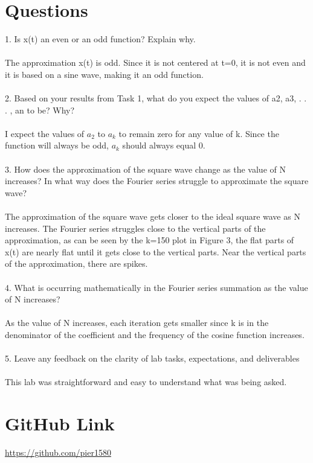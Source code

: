 \section{Questions}
1. Is x(t) an even or an odd function? Explain why.
\\ \\
The approximation x(t) is odd.  Since it is not centered at t=0, it is not even and it is based on a sine wave, making it an odd function.
\\ \\
2. Based on your results from Task 1, what do you expect the values of a2, a3, . . . , an to be?  Why?
\\ \\
I expect the values of $a_2$ to $a_{k}$ to remain zero for any value of k.  Since the function will always be odd, $a_k$ should always equal 0.
\\ \\
3. How does the approximation of the square wave change as the value of N increases? In what way does the Fourier series struggle to approximate the square wave?
\\ \\ 
The approximation of the square wave gets closer to the ideal square wave as N increases.  The Fourier series struggles close to the vertical parts of the approximation, as can be seen by the k=150 plot in Figure 3, the flat parts of x(t) are nearly flat until it gets close to the vertical parts.  Near the vertical parts of the approximation, there are spikes.
\\ \\
4. What is occurring mathematically in the Fourier series summation as the value of N increases?
\\ \\ 
As the value of N increases, each iteration gets smaller since k is in the denominator of the coefficient and the frequency of the cosine function increases.
\\ \\ 
5. Leave any feedback on the clarity of lab tasks, expectations, and deliverables
\\ \\ 
This lab was straightforward and easy to understand what was being asked.


\section{GitHub Link}
\url{https://github.com/pier1580}

